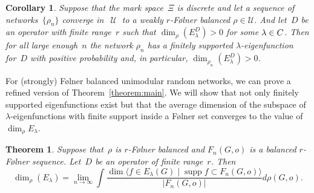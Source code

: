 \documentclass[english]{article}
\newtheorem{corollary}[lemma]{Corollary}
\newtheorem{theorem}[lemma]{Theorem}
\theoremstyle{definition}
\DeclareMathOperator{\supp}{supp}%
\DeclareMathOperator{\U}{{\mathcal{U}}}
\newcommand*{\field}[1]{\mathbf{#1}} %
\newcommand*\C{\field{C}} %
\begin{document}
\begin{corollary}\label{corollary:sofic1}
    Suppose that the mark space~$\Xi$ is discrete and let a sequence of networks~$\{\rho_n\}$  converge in~$\U$ to a weakly $r$-{F\o lner} balanced $\rho \in \mathcal{U}$. And let~$D$ be an operator with finite range~$r$ such that $\dim_\rho (E^D_\lambda) > 0$ for some $\lambda \in \mathbb \C$. Then for all large enough~$n$ the network $\rho_n$ has a finitely supported $\lambda$-eigenfunction for~$D$ with positive probability and, in particular, $\dim_{\rho_n}(E^D_\lambda)> 0$. 
\end{corollary}


For (strongly) {F\o lner} balanced unimodular random networks, we can prove a refined version of Theorem~\ref{theorem:main}. We will show that not only finitely supported eigenfunctions exist but that the average dimension of the subspace of $\lambda$-eigenfunctions with finite support inside a F\o lner set converges to the value of~$\dim_\rho E_\lambda$. 
\begin{theorem}\label{theorem:balanced}
    Suppose that~$\rho$ is $r$-{F\o lner} balanced and $F_n(G,o)$ is a balanced $r$-F\o lner sequence. Let~$D$ be an operator of finite range~$r$. Then 
    $$
    \dim_\rho(E_\lambda) = \lim_{n \to \infty}\int \frac{ \dim \langle f \in E_\lambda(G) \mid \supp f \subset F_n(G,o)\rangle}{|F_n(G,o)|} d\rho(G,o).
    $$
\end{theorem}
\end{document}
